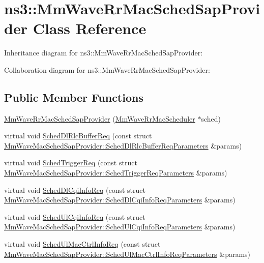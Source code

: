 \hypertarget{classns3_1_1MmWaveRrMacSchedSapProvider}{}\section{ns3\+:\+:Mm\+Wave\+Rr\+Mac\+Sched\+Sap\+Provider Class Reference}
\label{classns3_1_1MmWaveRrMacSchedSapProvider}


Inheritance diagram for ns3\+:\+:Mm\+Wave\+Rr\+Mac\+Sched\+Sap\+Provider\+:


Collaboration diagram for ns3\+:\+:Mm\+Wave\+Rr\+Mac\+Sched\+Sap\+Provider\+:
\subsection*{Public Member Functions}
\begin{DoxyCompactItemize}
\item 
\hyperlink{classns3_1_1MmWaveRrMacSchedSapProvider_a8de92d8335eb0ec6f57d2bdcf5e701e6}{Mm\+Wave\+Rr\+Mac\+Sched\+Sap\+Provider} (\hyperlink{classns3_1_1MmWaveRrMacScheduler}{Mm\+Wave\+Rr\+Mac\+Scheduler} $\ast$sched)
\item 
virtual void \hyperlink{classns3_1_1MmWaveRrMacSchedSapProvider_a270e1fa3d569cb41c0c939cc7b8ae8f4}{Sched\+Dl\+Rlc\+Buffer\+Req} (const struct \hyperlink{structns3_1_1MmWaveMacSchedSapProvider_1_1SchedDlRlcBufferReqParameters}{Mm\+Wave\+Mac\+Sched\+Sap\+Provider\+::\+Sched\+Dl\+Rlc\+Buffer\+Req\+Parameters} \&params)
\item 
virtual void \hyperlink{classns3_1_1MmWaveRrMacSchedSapProvider_a1ca15db67b7b1a4148be6557793e9c5f}{Sched\+Trigger\+Req} (const struct \hyperlink{structns3_1_1MmWaveMacSchedSapProvider_1_1SchedTriggerReqParameters}{Mm\+Wave\+Mac\+Sched\+Sap\+Provider\+::\+Sched\+Trigger\+Req\+Parameters} \&params)
\item 
virtual void \hyperlink{classns3_1_1MmWaveRrMacSchedSapProvider_aec6d99020e3c59cc581976eac4fa4583}{Sched\+Dl\+Cqi\+Info\+Req} (const struct \hyperlink{structns3_1_1MmWaveMacSchedSapProvider_1_1SchedDlCqiInfoReqParameters}{Mm\+Wave\+Mac\+Sched\+Sap\+Provider\+::\+Sched\+Dl\+Cqi\+Info\+Req\+Parameters} \&params)
\item 
virtual void \hyperlink{classns3_1_1MmWaveRrMacSchedSapProvider_aaa11767e6f2767b36694320485686421}{Sched\+Ul\+Cqi\+Info\+Req} (const struct \hyperlink{structns3_1_1MmWaveMacSchedSapProvider_1_1SchedUlCqiInfoReqParameters}{Mm\+Wave\+Mac\+Sched\+Sap\+Provider\+::\+Sched\+Ul\+Cqi\+Info\+Req\+Parameters} \&params)
\item 
virtual void \hyperlink{classns3_1_1MmWaveRrMacSchedSapProvider_ae34d717c1eebd925ec855929680707d6}{Sched\+Ul\+Mac\+Ctrl\+Info\+Req} (const struct \hyperlink{structns3_1_1MmWaveMacSchedSapProvider_1_1SchedUlMacCtrlInfoReqParameters}{Mm\+Wave\+Mac\+Sched\+Sap\+Provider\+::\+Sched\+Ul\+Mac\+Ctrl\+Info\+Req\+Parameters} \&params)
\end{DoxyCompactItemize}
